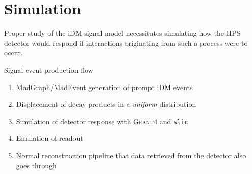 \chapter{Simulation}
\label{simulation_chapter}

Proper study of the iDM signal model necessitates simulating how the HPS detector
would respond if interactions originating from such a process were to occur.

Signal event production flow
\begin{enumerate}
    \item {\sc MadGraph/MadEvent} generation of prompt iDM events
    \item Displacement of decay products in a \emph{uniform} distribution
    \item Simulation of detector response with \textsc{Geant}4 and \texttt{slic}
    \item Emulation of readout
    \item Normal reconstruction pipeline that data retrieved from the detector
          also goes through
\end{enumerate}

